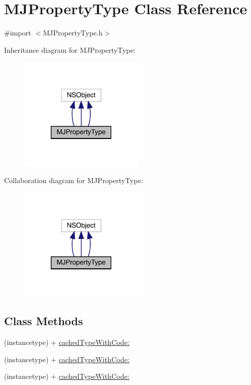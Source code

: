 \hypertarget{interface_m_j_property_type}{}\section{M\+J\+Property\+Type Class Reference}
\label{interface_m_j_property_type}


{\ttfamily \#import $<$M\+J\+Property\+Type.\+h$>$}



Inheritance diagram for M\+J\+Property\+Type\+:\nopagebreak
\begin{figure}[H]
\begin{center}
\leavevmode
\includegraphics[width=169pt]{interface_m_j_property_type__inherit__graph}
\end{center}
\end{figure}


Collaboration diagram for M\+J\+Property\+Type\+:\nopagebreak
\begin{figure}[H]
\begin{center}
\leavevmode
\includegraphics[width=169pt]{interface_m_j_property_type__coll__graph}
\end{center}
\end{figure}
\subsection*{Class Methods}
\begin{DoxyCompactItemize}
\item 
(instancetype) + \mbox{\hyperlink{interface_m_j_property_type_a1b3d3a2cf0c6c27846d4f8090a7d3d47}{cached\+Type\+With\+Code\+:}}
\item 
(instancetype) + \mbox{\hyperlink{interface_m_j_property_type_a1b3d3a2cf0c6c27846d4f8090a7d3d47}{cached\+Type\+With\+Code\+:}}
\item 
(instancetype) + \mbox{\hyperlink{interface_m_j_property_type_a1b3d3a2cf0c6c27846d4f8090a7d3d47}{cached\+Type\+With\+Code\+:}}
\end{DoxyCompactItemize}
